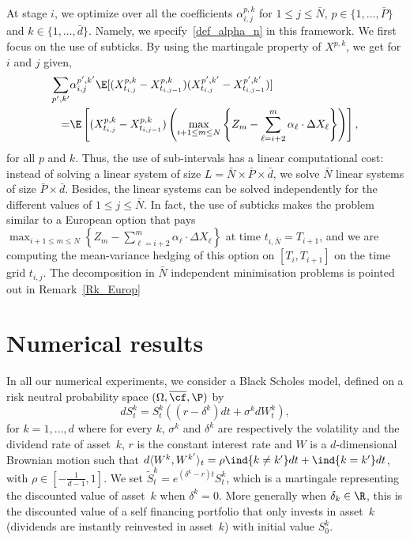 At stage $i$, we optimize over all the coefficients $\alpha^{{ p},k}_{i,j}$ for $1 \le j \le \bar{N}$, ${ p}\in \{1,\dots,\bar{P}\}$ and $k\in\{1,\dots, \bar{d}\}$. 
Namely, we specify~\eqref{def_alpha_n} in this framework. We first focus on the use of subticks. By using the martingale property of $X^{{ p},k}$, we get for $i$ and $j$ given, 
\begin{align} \label{linear_system_alpha}\sum_{{ p}',k'}  &\alpha_{i,j}^{{ p}',k'} \E[(X^{{ p},k}_{t_{i,j}}-X^{{ p},k}_{t_{i,j-1}})(X^{{ p}',k'}_{t_{i,j}}-X^{{ p}',k'}_{t_{i,j-1}})]\\=&\E\left[(X^{{ p},k}_{t_{i,j}}-X^{{ p},k}_{t_{i,j-1}}) \left(\max_{i + 1\le m \le N} \left\{ Z_{m} - \sum_{\ell=i+2}^{m} \alpha_\ell \cdot \Delta X_\ell \right\}  \right)\right], \notag
\end{align}
for all $p$ and $k$. 
Thus, the use of sub-intervals has a linear computational cost: instead of solving a linear system of size $L=\bar{N}\times \bar{P}\times \bar{d}$, we solve $\bar{N}$ linear systems of size $\bar{P}\times \bar{d}$. Besides, the linear systems can be solved independently for the different values of $1 \le j \le \bar{N}$. In fact, the use of subticks makes the problem similar to a European option that pays $\max_{i + 1\le m \le N} \left\{ Z_{m} - \sum_{\ell=i+2}^{m} \alpha_\ell \cdot \Delta X_\ell \right\}$ at time $t_{i,\bar{N}}=T_{i+1}$, and we are computing the mean-variance hedging of this option on $[T_i,T_{i+1}]$ on the time grid $t_{i,j}$. The decomposition in $\bar{N}$ independent minimisation problems is pointed out in Remark~\ref{Rk_Europ} 




\section{Numerical results}\label{Sec_Num}

In all our numerical experiments, we consider a Black Scholes model, defined on a risk neutral probability space $(\Omega,\overline{\cf},\P)$  by
\begin{equation}\label{eq:BS_model}
  dS^k_t = S^k_t \left((r - \delta^k ) dt + \sigma^k dW^k_t \right),
\end{equation}
for $k=1,\dots,d$ where for every $k$, $\sigma^k$ and $\delta^k$ are respectively the volatility and the dividend rate of asset~$k$, $r$ is the constant interest rate and $W$ is a $d$-dimensional Brownian motion such that $d\langle W^k, W^{k'} \rangle_t = \rho \ind{k \ne k'} dt + \ind{k = k'} dt$, with $\rho \in \left[-\frac{1}{d-1},1\right]$. We set $\tilde{S}^k_t=e^{(\delta^k-r)t}S^k_t$, which is a martingale representing the discounted value of asset~$k$ when $\delta^k=0$. More generally when $\delta_k \in \R$, this is the discounted value of a self financing portfolio that only invests in asset~$k$ (dividends are instantly reinvested in asset~$k$) with initial value $S_0^k$. 

